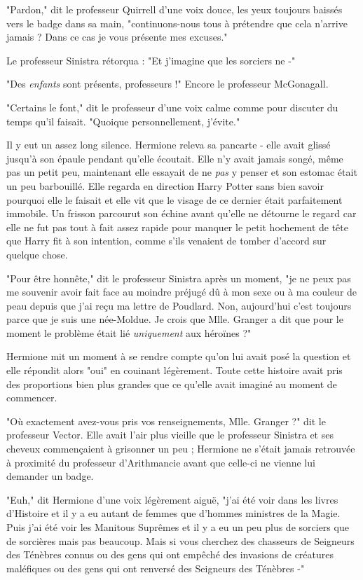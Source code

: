 "Pardon," dit le professeur Quirrell d'une voix douce, les yeux toujours baissés vers le badge dans sa main, "continuons-nous tous à prétendre que cela n'arrive jamais ? Dans ce cas je vous présente mes excuses."

Le professeur Sinistra rétorqua : "Et j'imagine que les sorciers ne -"

"Des \emph{enfants}  sont présents, professeurs !" Encore le professeur McGonagall.

"Certains le font," dit le professeur d'une voix calme comme pour discuter du temps qu'il faisait. "Quoique personnellement, j'évite."

Il y eut un assez long silence. Hermione releva sa pancarte - elle avait glissé jusqu'à son épaule pendant qu'elle écoutait. Elle n'y avait jamais songé, même pas un petit peu, maintenant elle essayait de ne \emph{pas}  y penser et son estomac était un peu barbouillé. Elle regarda en direction Harry Potter sans bien savoir pourquoi elle le faisait et elle vit que le visage de ce dernier était parfaitement immobile. Un frisson parcourut son échine avant qu'elle ne détourne le regard car elle ne fut pas tout à fait assez rapide pour manquer le petit hochement de tête que Harry fit à son intention, comme s'ils venaient de tomber d'accord sur quelque chose.

"Pour être honnête," dit le professeur Sinistra après un moment, "je ne peux pas me souvenir avoir fait face au moindre préjugé dû à mon sexe ou à ma couleur de peau depuis que j'ai reçu ma lettre de Poudlard. Non, aujourd'hui c'est toujours parce que je suis une née-Moldue. Je crois que Mlle. Granger a dit que pour le moment le problème était lié \emph{uniquement}  aux héroïnes ?"

Hermione mit un moment à se rendre compte qu'on lui avait posé la question et elle répondit alors "oui" en couinant légèrement. Toute cette histoire avait pris des proportions bien plus grandes que ce qu'elle avait imaginé au moment de commencer.

"Où exactement avez-vous pris vos renseignements, Mlle. Granger ?" dit le professeur Vector. Elle avait l'air plus vieille que le professeur Sinistra et ses cheveux commençaient à grisonner un peu ; Hermione ne s'était jamais retrouvée à proximité du professeur d'Arithmancie avant que celle-ci ne vienne lui demander un badge.

"Euh," dit Hermione d'une voix légèrement aiguë, "j'ai été voir dans les livres d'Histoire et il y a eu autant de femmes que d'hommes ministres de la Magie. Puis j'ai été voir les Manitous Suprêmes et il y a eu un peu plus de sorciers que de sorcières mais pas beaucoup. Mais si vous cherchez des chasseurs de Seigneurs des Ténèbres connus ou des gens qui ont empêché des invasions de créatures maléfiques ou des gens qui ont renversé des Seigneurs des Ténèbres -"

